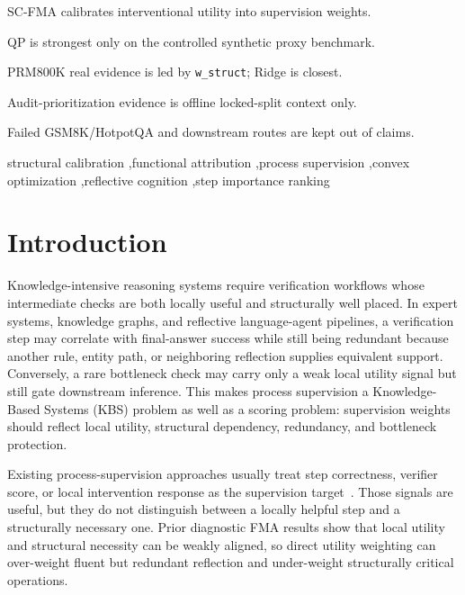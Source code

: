 \documentclass[a4paper,fleqn]{cas-sc}
\begin{document}
\begin{highlights}
\item SC-FMA calibrates interventional utility into supervision weights.
\item QP is strongest only on the controlled synthetic proxy benchmark.
\item PRM800K real evidence is led by \texttt{w\_struct}; Ridge is closest.
\item Audit-prioritization evidence is offline locked-split context only.
\item Failed GSM8K/HotpotQA and downstream routes are kept out of claims.
\end{highlights}

\begin{keywords}
structural calibration \sep functional attribution \sep process supervision \sep convex optimization \sep reflective cognition \sep step importance ranking
\end{keywords}

\maketitle

\section{Introduction}

Knowledge-intensive reasoning systems require verification workflows whose intermediate checks are both locally useful and structurally well placed. In expert systems, knowledge graphs, and reflective language-agent pipelines, a verification step may correlate with final-answer success while still being redundant because another rule, entity path, or neighboring reflection supplies equivalent support. Conversely, a rare bottleneck check may carry only a weak local utility signal but still gate downstream inference. This makes process supervision a Knowledge-Based Systems (KBS) problem as well as a scoring problem: supervision weights should reflect local utility, structural dependency, redundancy, and bottleneck protection.

Existing process-supervision approaches usually treat step correctness, verifier score, or local intervention response as the supervision target~\citep{lightman2023verify,wang2024mathshepherd,zheng2024processbench}. Those signals are useful, but they do not distinguish between a locally helpful step and a structurally necessary one. Prior diagnostic FMA results show that local utility and structural necessity can be weakly aligned, so direct utility weighting can over-weight fluent but redundant reflection and under-weight structurally critical operations.
\end{document}
